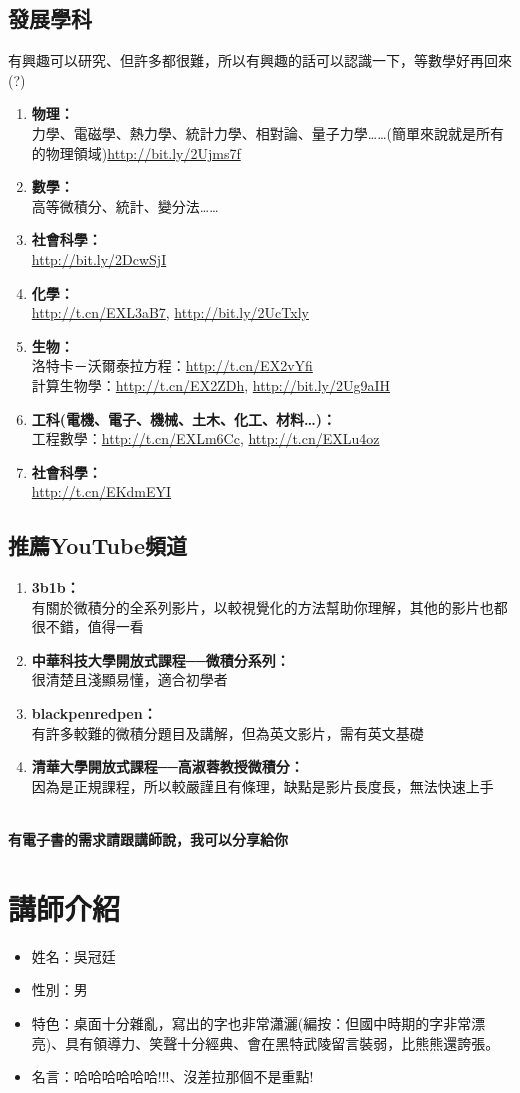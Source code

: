 \subsection{發展學科}
有興趣可以研究、但許多都很難，所以有興趣的話可以認識一下，等數學好再回來(?) \\
\begin{enumerate}
\item \textbf{物理：} \\
力學、電磁學、熱力學、統計力學、相對論、量子力學……(簡單來說就是所有的物理領域)\url{http://bit.ly/2Ujms7f}
\item \textbf{數學：} \\
高等微積分、統計、變分法……
\item \textbf{社會科學：} \\
\url{http://bit.ly/2DcwSjI}
\item \textbf{化學：} \\
\url{http://t.cn/EXL3aB7}, \url{http://bit.ly/2UcTxly}
\item \textbf{生物：} \\
洛特卡－沃爾泰拉方程：\url{http://t.cn/EX2vYfi}\\
計算生物學：\url{http://t.cn/EX2ZDh}, \url{http://bit.ly/2Ug9aIH}
\item \textbf{工科(電機、電子、機械、土木、化工、材料…)：} \\
工程數學：\url{http://t.cn/EXLm6Cc}, \url{http://t.cn/EXLu4oz}
\item \textbf{社會科學：} \\
\url{http://t.cn/EKdmEYI}
\end{enumerate}
\subsection{推薦YouTube頻道}
\begin{enumerate}
\item \textbf{3b1b：} \\
有關於微積分的全系列影片，以較視覺化的方法幫助你理解，其他的影片也都很不錯，值得一看~~
\item \textbf{中華科技大學開放式課程──微積分系列：} \\
很清楚且淺顯易懂，適合初學者
\item \textbf{blackpenredpen：} \\
有許多較難的微積分題目及講解，但為英文影片，需有英文基礎
\item \textbf{清華大學開放式課程──高淑蓉教授微積分：} \\
因為是正規課程，所以較嚴謹且有條理，缺點是影片長度長，無法快速上手 \\ \\
\end{enumerate}
\begin{center}
\textbf{\large 有電子書的需求請跟講師說，我可以分享給你~~~}
\end{center}

\section{講師介紹}
\begin{itemize}
\item 姓名：吳冠廷
\item 性別：男
\item 特色：桌面十分雜亂，寫出的字也非常瀟灑(編按：但國中時期的字非常漂亮)、具有領導力、笑聲十分經典、會在黑特武陵留言裝弱，比熊熊還誇張。
\item 名言：哈哈哈哈哈哈!!!、沒差拉那個不是重點!
\end{itemize}